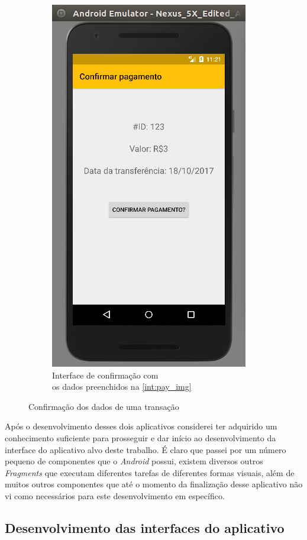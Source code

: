 \documentclass[hidelinks,12pt]{article}
\begin{document}
\begin{figure}[H]
\begin{subfigure}{0.5\textwidth}
		\includegraphics[scale=0.5]{int:confirm}
		\caption{Interface de confirma\c{c}\~ao com\\\hspace{\textwidth}os dados preenchidos na \ref{int:pay_img}}
		\label{int:confirm}
	\end{subfigure}
	\caption{Confirma\c{c}\~ao dos dados de uma transa\c{c}\~ao}
	\label{pay_composite}
\end{figure}

Ap\'os o desenvolvimento desses dois aplicativos considerei ter adquirido um conhecimento suficiente para prosseguir e dar início ao desenvolvimento da interface do aplicativo alvo deste trabalho. \'E claro que passei por um n\'umero pequeno de componentes que o \textit{Android} possui, existem diversos outros \textit{Fragments} que executam diferentes tarefas de diferentes formas visuais, além de muitos outros componentes que at\'e o momento da finaliza\c{c}\~ao desse aplicativo n\~ao vi como necess\'arios para este desenvolvimento em espec\'ifico.

\subsection{Desenvolvimento das interfaces do aplicativo} \label{dev}
\end{document}
